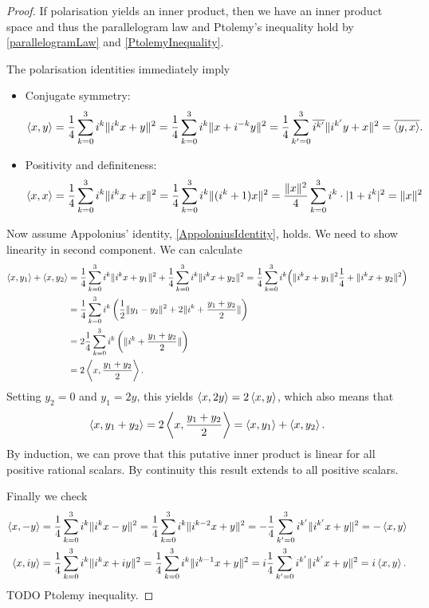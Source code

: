 \begin{proof}
If polarisation yields an inner product, then we have an inner product space and thus the parallelogram law and Ptolemy's inequality hold by \ref{parallelogramLaw} and \ref{PtolemyInequality}.

The polarisation identities immediately imply
\begin{itemize}
\item Conjugate symmetry:
\[ \left\langle x,y \right\rangle = \frac{1}{4}\sum_{k=0}^3i^k\lVert i^k x+ y\rVert^2 = \frac{1}{4}\sum_{k=0}^3i^k\lVert x+ i^{-k}y\rVert^2 = \frac{1}{4}\sum_{k'=0}^3\overline{i^{k'}}\lVert i^{k'}y+ x\rVert^2 = \overline{\left\langle y,x \right\rangle}. \]
\item Positivity and definiteness:
\[ \left\langle x,x \right\rangle = \frac{1}{4}\sum_{k=0}^3i^k\lVert i^k x+ x\rVert^2 = \frac{1}{4}\sum_{k=0}^3i^k\lVert(i^k+1)x\rVert^2 = \frac{\lVert x\rVert^2}{4}\sum_{k=0}^3 i^k\cdot |1+i^k|^2 = \lVert x\rVert^2 \]
\end{itemize}
Now assume Appolonius' identity, \ref{AppoloniusIdentity}, holds. We need to show linearity in second component.
We can calculate
\begin{align*}
\left\langle x,y_1 \right\rangle + \left\langle x,y_2 \right\rangle &= \frac{1}{4}\sum_{k=0}^3i^k\lVert i^k x+ y_1\rVert^2 + \frac{1}{4}\sum_{k=0}^3i^k\lVert i^k x+ y_2\rVert^2 = \frac{1}{4}\sum_{k=0}^3i^k\Big(\lVert i^k x+ y_1\rVert^2\frac{1}{4} + \lVert i^k x+ y_2\rVert^2\Big) \\
&= \frac{1}{4}\sum_{k=0}^3i^k\left(\frac{1}{2}\lVert y_1-y_2\rVert^2 + 2\lVert i^k+\frac{y_1+y_2}{2}\rVert\right) \\
&= 2\frac{1}{4}\sum_{k=0}^3i^k\left(\lVert i^k+\frac{y_1+y_2}{2}\rVert\right) \\
&= 2\left\langle x,\frac{y_1+ y_2}{2} \right\rangle.
\end{align*}
Setting $y_2 = 0$ and $y_1 = 2y$, this yields $\left\langle x,2y \right\rangle = 2\left\langle x,y \right\rangle$, which also means that
\[ \left\langle x,y_1+y_2 \right\rangle = 2\left\langle x,\frac{y_1+ y_2}{2} \right\rangle = \left\langle x,y_1 \right\rangle + \left\langle x,y_2 \right\rangle. \]
By induction, we can prove that this putative inner product is linear for all positive rational scalars. By continuity this result extends to all positive scalars.

Finally we check
\begin{align*}
\left\langle x,-y \right\rangle &= \frac{1}{4}\sum_{k=0}^3i^k\lVert i^k x - y\rVert^2 = \frac{1}{4}\sum_{k=0}^3i^k\lVert i^{k-2} x + y\rVert^2 = -\frac{1}{4}\sum_{k'=0}^3i^{k'}\lVert i^{k'} x + y\rVert^2 = -\left\langle x,y \right\rangle \\
\left\langle x,iy \right\rangle &= \frac{1}{4}\sum_{k=0}^3i^k\lVert i^k x + iy\rVert^2 = \frac{1}{4}\sum_{k=0}^3i^k\lVert i^{k-1} x + y\rVert^2 = i\frac{1}{4}\sum_{k'=0}^3i^{k'}\lVert i^{k'} x + y\rVert^2 = i\left\langle x,y \right\rangle.
\end{align*}
TODO Ptolemy inequality.
\end{proof}
